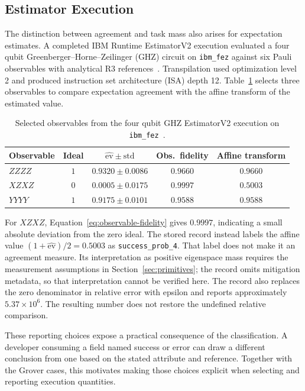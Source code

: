 \documentclass[10pt,conference]{IEEEtran}
\begin{document}
\subsection{Estimator Execution}
\label{sec:worked-estimator}

The distinction between agreement and task mass also arises for expectation estimates. A completed IBM Runtime EstimatorV2 execution evaluated a four qubit Greenberger--Horne--Zeilinger (GHZ) circuit on \texttt{ibm\_fez} against six Pauli observables with analytical R3 references~\cite{qwardEstimatorData2026}. Transpilation used optimization level 2 and produced instruction set architecture (ISA) depth 12. Table~\ref{tab:worked-estimator} selects three observables to compare expectation agreement with the affine transform of the estimated value.

\begin{table}[ht]
\centering
\caption{Selected observables from the four qubit GHZ EstimatorV2 execution on \texttt{ibm\_fez}~\cite{qwardEstimatorData2026}.}
\label{tab:worked-estimator}
\renewcommand{\arraystretch}{1.1}
\begin{tabular}{@{}lcccc@{}}
\toprule
\textbf{Observable} & \textbf{Ideal} & $\widehat{\mathrm{ev}}\pm\mathrm{std}$ & \textbf{Obs.\ fidelity} & \textbf{Affine transform} \\
\midrule
$ZZZZ$ & $1$ & $0.9320\pm0.0086$ & $0.9660$ & $0.9660$ \\
$XZXZ$ & $0$ & $0.0005\pm0.0175$ & $0.9997$ & $0.5003$ \\
$YYYY$ & $1$ & $0.9175\pm0.0101$ & $0.9588$ & $0.9588$ \\
\bottomrule
\end{tabular}
\end{table}

For $XZXZ$, Equation~\ref{eq:observable-fidelity} gives $0.9997$, indicating a small absolute deviation from the zero ideal. The stored record instead labels the affine value $(1+\widehat{\mathrm{ev}})/2=0.5003$ as \texttt{success\_prob\_4}. That label does not make it an agreement measure. Its interpretation as positive eigenspace mass requires the measurement assumptions in Section~\ref{sec:primitives}; the record omits mitigation metadata, so that interpretation cannot be verified here. The record also replaces the zero denominator in relative error with epsilon and reports approximately $5.37\times10^6$. The resulting number does not restore the undefined relative comparison.

These reporting choices expose a practical consequence of the classification. A developer consuming a field named success or error can draw a different conclusion from one based on the stated attribute and reference. Together with the Grover cases, this motivates making those choices explicit when selecting and reporting execution quantities.
\end{document}
